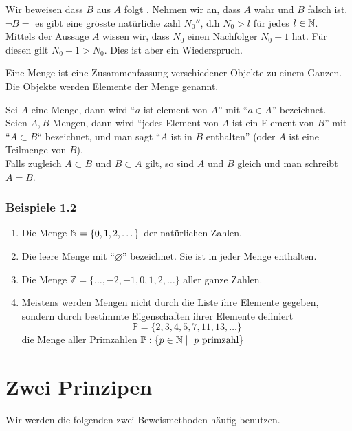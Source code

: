 \noindent Wir beweisen dass $B$ aus $A$ folgt . Nehmen wir an, dass $A$ wahr und $B$ falsch ist. \\

\noindent $\lnot B=$ es gibt eine grösste natürliche zahl $N_0''$, d.h $N_0>l$ für jedes $l \in \mathbb{N}$.\\

Mittels der Aussage $A$ wissen wir, dass $N_0$ einen Nachfolger $N_0 +1$ hat. Für diesen gilt $N_0+1>N_0$. Dies ist aber ein Wiederspruch.

\begin{definition}{1.1}
Eine Menge ist eine Zusammenfassung verschiedener Objekte zu einem Ganzen.\\
Die Objekte werden Elemente der Menge genannt. 
\end{definition}

Sei $A$ eine Menge, dann wird ``$a$ ist element von $A$'' mit ``$a\in A$'' bezeichnet.\\
Seien $A,B$ Mengen, dann wird ``jedes Element von $A$ ist ein Element von $B$'' mit ``$A\subset B$`` bezeichnet, und man sagt ``$A$ ist in $B$ enthalten'' (oder $A$ ist eine Teilmenge von $B$). \\

Falls zugleich $A\subset B$ und $B\subset A$ gilt, so sind $A$ und $B$ gleich und man schreibt $A=B$. 

\subsubsection*{Beispiele 1.2}
\begin{enumerate}
	\item Die Menge $\mathbb{N}=\{0,1,2,\dots\}$ der natürlichen Zahlen.
	\item Die leere Menge mit ``$\varnothing$'' bezeichnet. Sie ist in jeder Menge enthalten.
	\item Die Menge $\mathbb{Z}=\{\dots,-2,-1,0,1,2,\dots\}$ aller ganze Zahlen.
	\item Meistens werden Mengen nicht durch die Liste ihre Elemente gegeben, sondern durch bestimmte Eigenschaften ihrer Elemente definiert \[\mathbb{P}=\{2,3,4,5,7,11,13,\dots\}\] die Menge aller Primzahlen $\mathbb{P}:\{p\in\mathbb{N}\mid\text{ $p$ primzahl}\}$
\end{enumerate}
\section{Zwei Prinzipen}
Wir werden die folgenden zwei Beweismethoden häufig benutzen.

